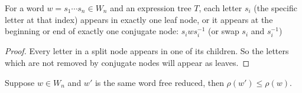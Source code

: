 \documentclass[12pt]{thesis}
\begin{document}
\begin{proposition}
    \label{prop:letters-in-tree}
    For a word $w = s_{1} \cdots s_{n} \in W_{n}$
    and an expression tree $T$,
    each letter $s_{i}$ (the specific letter at that index) appears
    in exactly one leaf node,
    or it appears at the beginning
    or end of exactly one conjugate node:
    $s_{i}ws_{i}^{-1}$ (or swap $s_{i}$ and $s_{i}^{-1}$)
\end{proposition}

\begin{proof}
    Every letter in a split node appears in
    one of its children.
    So the letters which are not removed by conjugate nodes
    will appear as leaves.
\end{proof}

\begin{theorem}
    \label{thm:invariant-free-reduction}
    Suppose $w \in W_{n}$ and $w'$
    is the same word free reduced,
    then $\rho(w') \leq \rho(w)$.
\end{theorem}
\end{document}
